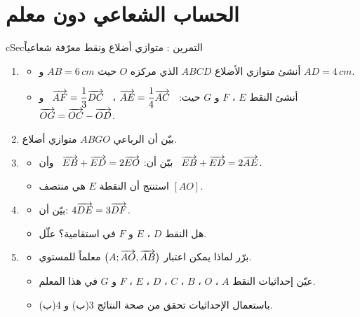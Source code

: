 \documentclass[12pt,a4paper]{article}
\newenvironment{BOX}[2]{\begin{otherlanguage}{english}\begin{arbox}{#1}{#2}}{\end{arbox}\end{otherlanguage}}
\newcounter{exo}
\newenvironment{tamrin}[1]{\stepcounter{exo}\begin{BOX}{cSec}{التمرين \theexo: #1}}{\end{BOX}}
\newenvironment{sq}{\begin{itemize}[leftmargin=2.4em,itemsep=3pt]}{\end{itemize}}
\newcommand{\qa}{\item[(أ)]}\newcommand{\qb}{\item[(ب)]}\newcommand{\qc}{\item[(جـ)]}\newcommand{\qd}{\item[(د)]}\newcommand{\qe}{\item[(هـ)]}
\begin{document}
\section{الحساب الشعاعي دون معلم}
\begin{tamrin}{متوازي أضلاع ونقط معرّفة شعاعياً}
\begin{enumerate}
\item
\begin{sq}
\qa أنشئ متوازي الأضلاع $ABCD$ الذي مركزه $O$ حيث $AB=6\,cm$ و $AD=4\,cm$.
\qb أنشئ النقط $E$ ، $F$ و $G$ حيث: \ $\overrightarrow{AE}=\dfrac14\overrightarrow{AC}$ ، \ $\overrightarrow{AF}=\dfrac13\overrightarrow{DC}$ \ و \ $\overrightarrow{OG}=\overrightarrow{OC}-\overrightarrow{OD}$.
\end{sq}
\item بيّن أن الرباعي $ABGO$ متوازي أضلاع.
\item
\begin{sq}
\qa بيّن أن: $\overrightarrow{EB}+\overrightarrow{ED}=2\overrightarrow{EO}$ \ وأن \ $\overrightarrow{EB}+\overrightarrow{ED}=2\overrightarrow{AE}$.
\qb استنتج أن النقطة $E$ هي منتصف $[AO]$.
\end{sq}
\item
\begin{sq}
\qa بيّن أن: $4\overrightarrow{DE}=3\overrightarrow{DF}$.
\qb هل النقط $D$ ، $E$ و $F$ في استقامية؟ علّل.
\end{sq}
\item
\begin{sq}
\qa برّر لماذا يمكن اعتبار $\big(A;\overrightarrow{AO},\overrightarrow{AB}\big)$ معلماً للمستوي.
\qb عيّن إحداثيات النقط $A$ ، $O$ ، $B$ ، $C$ ، $D$ ، $E$ ، $F$ و $G$ في هذا المعلم.
\qc باستعمال الإحداثيات تحقق من صحة النتائج 3(ب) و 4(ب).
\end{sq}
\end{enumerate}
\end{tamrin}
\end{document}
